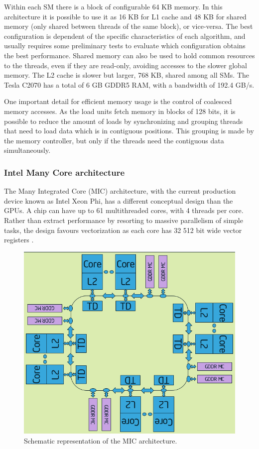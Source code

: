 Within each SM there is a block of configurable 64 KB memory. In this architecture it is possible to use it as 16 KB for L1 cache and 48 KB for shared memory (only shared between threads of the same block), or vice-versa. The best configuration is dependent of the specific characteristics of each algorithm, and usually requires some preliminary tests to evaluate which configuration obtains the best performance. Shared memory can also be used to hold common resources to the threads, even if they are read-only, avoiding accesses to the slower global memory. The L2 cache is slower but larger, 768 KB, shared among all SMs. The Tesla C2070 has a total of 6 GB GDDR5 RAM, with a bandwidth of 192.4 GB/s.

One important detail for efficient memory usage is the control of coalesced memory accesses. As the load units fetch memory in blocks of 128 bits, it is possible to reduce the amount of loads by synchronizing and grouping threads that need to load data which is in contiguous positions. This grouping is made by the memory controller, but only if the threads need the contiguous data simultaneously.

\subsubsection*{Intel Many Core architecture}
\label{MIC}

The \intel Many Integrated Core (MIC) architecture, with the current production device known as Intel Xeon Phi, has a different conceptual design than the \nvidia GPUs. A chip can have up to 61 multithreaded cores, with 4 threads per core. Rather than extract performance by resorting to massive parallelism of simple tasks, the design favours vectorization as each core has 32 512 bit wide vector registers \cite{Intel:MIC}.

\begin{figure}[!htp]
	\begin{center}
		\includegraphics[scale=0.5]{../../common/img/mic_arch.png}
		\caption{Schematic representation of the \intel MIC architecture.}
		\label{fig:MICArchitecture}
	\end{center}
\end{figure}

